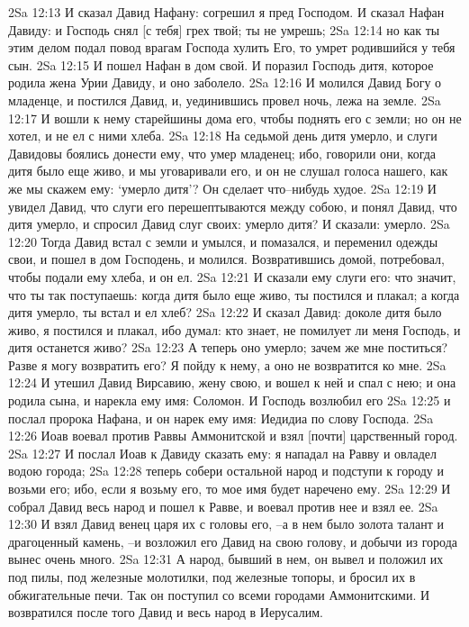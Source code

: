 2Sa 12:13  И сказал Давид Нафану: согрешил я пред Господом. И сказал Нафан Давиду: и Господь снял [с тебя] грех твой; ты не умрешь;
2Sa 12:14  но как ты этим делом подал повод врагам Господа хулить Его, то умрет родившийся у тебя сын.
2Sa 12:15  И пошел Нафан в дом свой. И поразил Господь дитя, которое родила жена Урии Давиду, и оно заболело.
2Sa 12:16  И молился Давид Богу о младенце, и постился Давид, и, уединившись провел ночь, лежа на земле.
2Sa 12:17  И вошли к нему старейшины дома его, чтобы поднять его с земли; но он не хотел, и не ел с ними хлеба.
2Sa 12:18  На седьмой день дитя умерло, и слуги Давидовы боялись донести ему, что умер младенец; ибо, говорили они, когда дитя было еще живо, и мы уговаривали его, и он не слушал голоса нашего, как же мы скажем ему: `умерло дитя'? Он сделает что--нибудь худое.
2Sa 12:19  И увидел Давид, что слуги его перешептываются между собою, и понял Давид, что дитя умерло, и спросил Давид слуг своих: умерло дитя? И сказали: умерло.
2Sa 12:20  Тогда Давид встал с земли и умылся, и помазался, и переменил одежды свои, и пошел в дом Господень, и молился. Возвратившись домой, потребовал, чтобы подали ему хлеба, и он ел.
2Sa 12:21  И сказали ему слуги его: что значит, что ты так поступаешь: когда дитя было еще живо, ты постился и плакал; а когда дитя умерло, ты встал и ел хлеб?
2Sa 12:22  И сказал Давид: доколе дитя было живо, я постился и плакал, ибо думал: кто знает, не помилует ли меня Господь, и дитя останется живо?
2Sa 12:23  А теперь оно умерло; зачем же мне поститься? Разве я могу возвратить его? Я пойду к нему, а оно не возвратится ко мне.
2Sa 12:24  И утешил Давид Вирсавию, жену свою, и вошел к ней и спал с нею; и она родила сына, и нарекла ему имя: Соломон. И Господь возлюбил его
2Sa 12:25  и послал пророка Нафана, и он нарек ему имя: Иедидиа по слову Господа.
2Sa 12:26  Иоав воевал против Раввы Аммонитской и взял [почти] царственный город.
2Sa 12:27  И послал Иоав к Давиду сказать ему: я нападал на Равву и овладел водою города;
2Sa 12:28  теперь собери остальной народ и подступи к городу и возьми его; ибо, если я возьму его, то мое имя будет наречено ему.
2Sa 12:29  И собрал Давид весь народ и пошел к Равве, и воевал против нее и взял ее.
2Sa 12:30  И взял Давид венец царя их с головы его, --а в нем было золота талант и драгоценный камень, --и возложил его Давид на свою голову, и добычи из города вынес очень много.
2Sa 12:31  А народ, бывший в нем, он вывел и положил их под пилы, под железные молотилки, под железные топоры, и бросил их в обжигательные печи. Так он поступил со всеми городами Аммонитскими. И возвратился после того Давид и весь народ в Иерусалим.
